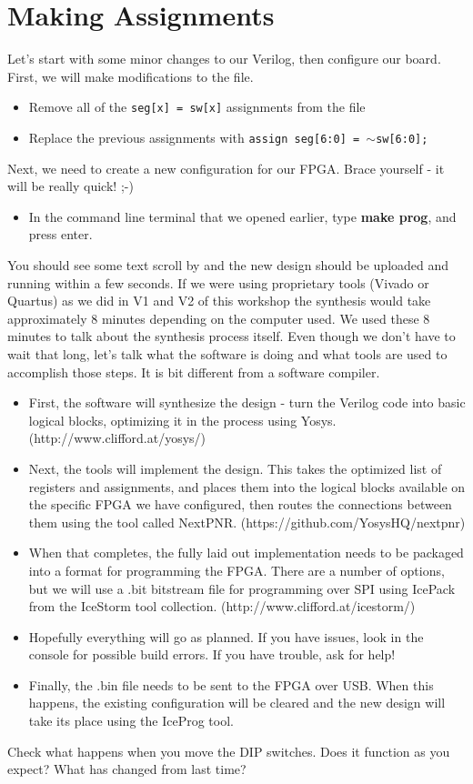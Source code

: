 \documentclass[12pt,a4paper]{article}
\begin{document}
\section{Making Assignments}
Let’s start with some minor changes to our Verilog, then configure our board. First, we will make modifications to the file. 
\begin{itemize}
	\item Remove all of the \texttt{seg[x] = sw[x]} assignments from the file 
	\item Replace the previous assignments with \texttt{assign seg[6:0] = $\sim$sw[6:0];}
\end{itemize}
\noindent
Next, we need to create a new configuration for our FPGA. Brace yourself - it will be really quick! ;-)
\begin{itemize}
	\item In the command line terminal that we opened earlier, type \textbf{make prog}, and press enter. 
\end{itemize}
\noindent
You should see some text scroll by and the new design should be uploaded and running within a few seconds. If we were using proprietary tools (Vivado or Quartus) as we did in V1 and V2 of this workshop the synthesis would take approximately 8 minutes depending on the computer used. We used these 8 minutes to talk about the synthesis process itself. Even though we don’t have to wait that long, let’s talk what the software is doing and what tools are used to accomplish those steps. It is bit different from a software compiler.

\begin{itemize}
	\item First, the software will synthesize the design - turn the Verilog code into basic logical blocks, optimizing it in the process using Yosys. (http://www.clifford.at/yosys/)
	\item Next, the tools will implement the design. This takes the optimized list of registers and assignments, and places them into the logical blocks available on the specific FPGA we have configured, then routes the connections between them using the tool called NextPNR. (https://github.com/YosysHQ/nextpnr)
	\item When that completes, the fully laid out 	implementation needs to be packaged into a 	format for programming the FPGA. There are a 	number of options, but we will use a .bit bitstream file for programming over SPI using IcePack from the IceStorm tool collection.
	(http://www.clifford.at/icestorm/)
	\item Hopefully everything will go as planned. If you have issues, look in the console for possible build errors. If you have trouble, ask for help!
	\item Finally, the .bin file needs to be sent to the FPGA over USB. When this happens, the existing configuration will be cleared and the new design will take its place using the IceProg tool.
\end{itemize}
\noindent
Check what happens when you move the DIP switches. Does it function as you expect? What has changed from last time?
\end{document}
